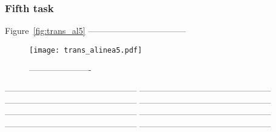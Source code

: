 \subsubsection{Fifth task}

Figure~\ref{fig:trans_al5} ----------------------------------- 

\begin{figure}[H] \centering
  \texttt{[image: trans\_alinea5.pdf]}
  \caption{ ---------------------- }
  \label{fig:trans_al3}
  \end{figure}

-----------------------------------------------
-----------------------------------------------
-----------------------------------------------
-----------------------------------------------
-----------------------------------------------
-----------------------------------------------
-----------------------------------------------
-----------------------------------------------
